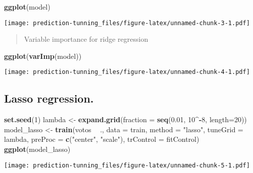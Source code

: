 \documentclass[]{article}
\newenvironment{Shaded}{\begin{snugshade}}{\end{snugshade}}
\newcommand{\KeywordTok}[1]{\textcolor[rgb]{0.13,0.29,0.53}{\textbf{#1}}}
\newcommand{\DataTypeTok}[1]{\textcolor[rgb]{0.13,0.29,0.53}{#1}}
\newcommand{\DecValTok}[1]{\textcolor[rgb]{0.00,0.00,0.81}{#1}}
\newcommand{\FloatTok}[1]{\textcolor[rgb]{0.00,0.00,0.81}{#1}}
\newcommand{\StringTok}[1]{\textcolor[rgb]{0.31,0.60,0.02}{#1}}
\newcommand{\OperatorTok}[1]{\textcolor[rgb]{0.81,0.36,0.00}{\textbf{#1}}}
\newcommand{\NormalTok}[1]{#1}
\begin{document}
\begin{Shaded}
\begin{Highlighting}[]
\KeywordTok{ggplot}\NormalTok{(model)}
\end{Highlighting}
\end{Shaded}

\texttt{[image: prediction-tunning\_files/figure-latex/unnamed-chunk-3-1.pdf]}

\begin{quote}
Variable importance for ridge regression
\end{quote}

\begin{Shaded}
\begin{Highlighting}[]
\KeywordTok{ggplot}\NormalTok{(}\KeywordTok{varImp}\NormalTok{(model))}
\end{Highlighting}
\end{Shaded}

\texttt{[image: prediction-tunning\_files/figure-latex/unnamed-chunk-4-1.pdf]}

\subsection{Lasso regression.}\label{lasso-regression.}

\begin{Shaded}
\begin{Highlighting}[]
\KeywordTok{set.seed}\NormalTok{(}\DecValTok{1}\NormalTok{)}
\NormalTok{lambda <-}\StringTok{ }\KeywordTok{expand.grid}\NormalTok{(}\DataTypeTok{fraction =} \KeywordTok{seq}\NormalTok{(}\FloatTok{0.01}\NormalTok{, }\DecValTok{10}\OperatorTok{^-}\DecValTok{8}\NormalTok{, }\DataTypeTok{length=}\DecValTok{20}\NormalTok{))}
\NormalTok{model_lasso <-}\StringTok{ }\KeywordTok{train}\NormalTok{(votos }\OperatorTok{~}\StringTok{ }\NormalTok{., }
                     \DataTypeTok{data =}\NormalTok{ train, }
                     \DataTypeTok{method =} \StringTok{"lasso"}\NormalTok{, }
                     \DataTypeTok{tuneGrid =}\NormalTok{ lambda,}
                     \DataTypeTok{preProc =} \KeywordTok{c}\NormalTok{(}\StringTok{"center"}\NormalTok{, }\StringTok{"scale"}\NormalTok{),}
                     \DataTypeTok{trControl =}\NormalTok{ fitControl)}
\KeywordTok{ggplot}\NormalTok{(model_lasso)}
\end{Highlighting}
\end{Shaded}

\texttt{[image: prediction-tunning\_files/figure-latex/unnamed-chunk-5-1.pdf]}
\end{document}
